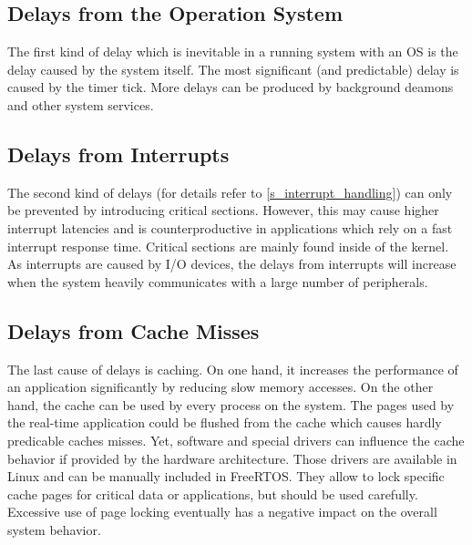 \subsection{Delays from the Operation System}
The first kind of delay which is inevitable in a running system with an \ac{OS} is the delay caused by the system itself.
The most significant (and predictable) delay is caused by the timer tick.
More delays can be produced by background deamons and other system services. 

\subsection{Delays from Interrupts}
The second kind of delays (for details refer to \ref{s_interrupt_handling}) can only be prevented by introducing critical sections. 
However, this may cause higher interrupt latencies and is counterproductive in applications which rely on a fast interrupt response time.
Critical sections are mainly found inside of the kernel. 
As interrupts are caused by \ac{I/O} devices, the delays from interrupts will increase when the system heavily communicates with a large number of peripherals. 

\subsection{Delays from Cache Misses}
The last cause of delays is caching.
On one hand, it increases the performance of an application significantly by reducing slow memory accesses. 
On the other hand, the cache can be used by every process on the system.
The pages used by the real-time application could be flushed from the cache which causes hardly predicable caches misses.
Yet, software and special drivers can influence the cache behavior if provided by the hardware architecture.
Those drivers are available in Linux and can be manually included in FreeRTOS.
They allow to lock specific cache pages for critical data or applications, but should be used carefully.
Excessive use of page locking eventually has a negative impact on the overall system behavior.

